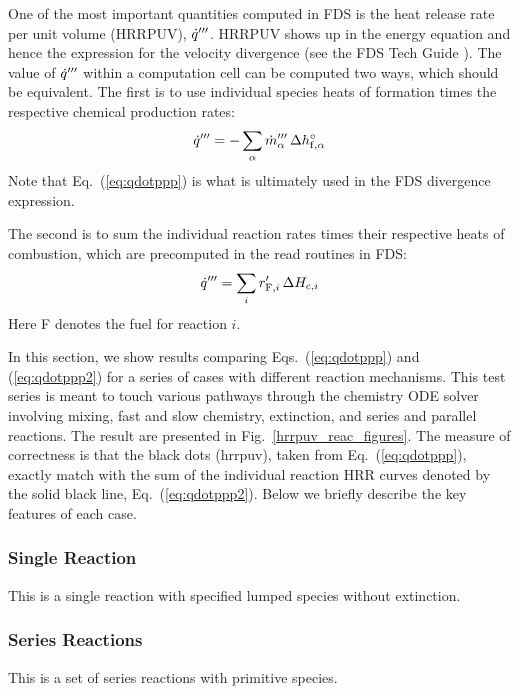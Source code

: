 \documentclass[11pt]{book}
\begin{document}
One of the most important quantities computed in FDS is the heat release rate per unit volume (HRRPUV), $\dot{q}^{{\prime\prime\prime}}$.  HRRPUV shows up in the energy equation and hence the expression for the velocity divergence (see the FDS Tech Guide \cite{FDS_Math_Guide}).  The value of $\dot{q}^{{\prime\prime\prime}}$ within a computation cell can be computed two ways, which should be equivalent.  The first is to use individual species heats of formation times the respective chemical production rates:
\begin{equation}
\label{eq:qdotppp}
\dot{q}^{{\prime\prime\prime}} = - \sum_\alpha \dot{m}_\alpha^{{\prime\prime\prime}} \, \Delta h_{{\rm f},\alpha}^\circ
\end{equation}
Note that Eq.~(\ref{eq:qdotppp}) is what is ultimately used in the FDS divergence expression.

The second is to sum the individual reaction rates  times their respective heats of combustion, which are precomputed in the read routines in FDS:
\begin{equation}
\label{eq:qdotppp2}
\dot{q}^{{\prime\prime\prime}} = \sum_i r_{{\rm F},i}^\prime \, \Delta H_{{\rm c},i}
\end{equation}
Here F denotes the fuel for reaction $i$.

In this section, we show results comparing Eqs.~(\ref{eq:qdotppp}) and (\ref{eq:qdotppp2}) for a series of cases with different reaction mechanisms.  This test series is meant to touch various pathways through the chemistry ODE solver involving mixing, fast and slow chemistry, extinction, and series and parallel reactions.  The result are presented in Fig.~\ref{hrrpuv_reac_figures}.  The measure of correctness is that the black dots (hrrpuv), taken from Eq.~(\ref{eq:qdotppp}), exactly match with the sum of the individual reaction HRR curves denoted by the solid black line, Eq.~(\ref{eq:qdotppp2}). Below we briefly describe the key features of each case.

\subsubsection{Single Reaction} 

This is a single reaction with specified lumped species without extinction.

\subsubsection{Series Reactions} 

This is a set of series reactions with primitive species.
\end{document}
